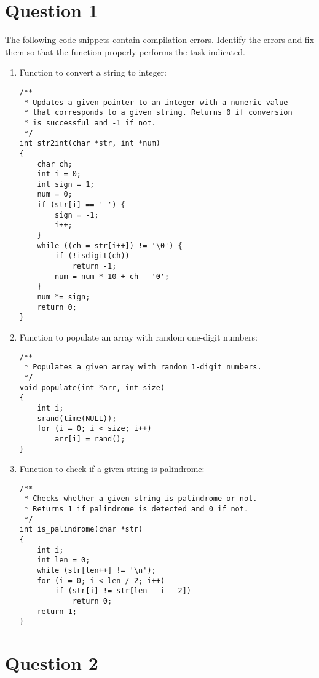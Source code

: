\documentclass[12pt,letterpaper,twoside]{article}
\begin{document}


\section*{Question 1}

The following code snippets contain compilation errors.
Identify the errors and fix them so that the function properly performs the task indicated.

\begin{enumerate}[label=\textbf{(\alph*)}]

\item Function to convert a string to integer:
\begin{lstlisting}
/**
 * Updates a given pointer to an integer with a numeric value
 * that corresponds to a given string. Returns 0 if conversion
 * is successful and -1 if not.
 */
int str2int(char *str, int *num)
{
	char ch;
	int i = 0;
	int sign = 1;
	num = 0;
	if (str[i] == '-') {
		sign = -1;
		i++;
	}
	while ((ch = str[i++]) != '\0') {
		if (!isdigit(ch))
			return -1;
		num = num * 10 + ch - '0';
	}
	num *= sign;
	return 0;
}
\end{lstlisting}

\item Function to populate an array with random one-digit numbers:
\begin{lstlisting}
/**
 * Populates a given array with random 1-digit numbers.
 */
void populate(int *arr, int size)
{
	int i;
	srand(time(NULL));
	for (i = 0; i < size; i++)
		arr[i] = rand();
}
\end{lstlisting}

\item Function to check if a given string is palindrome:
\begin{lstlisting}
/**
 * Checks whether a given string is palindrome or not.
 * Returns 1 if palindrome is detected and 0 if not.
 */
int is_palindrome(char *str)
{
	int i;
	int len = 0;
	while (str[len++] != '\n');
	for (i = 0; i < len / 2; i++)
		if (str[i] != str[len - i - 2])
			return 0;
	return 1;
}
\end{lstlisting}

\end{enumerate}

\section*{Question 2}
\end{document}
